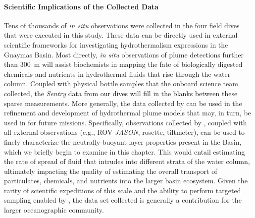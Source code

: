 \paragraph{Scientific Implications of the Collected Data}
Tens of thousands of \emph{in situ} observations were collected in the four field dives that were executed in this study. These data can be directly used in external scientific frameworks for investigating hydrothermalism expressions in the Guaymas Basin. Most directly, \emph{in situ} observations of plume detections further than \SI{300}{\meter} will assist biochemists in mapping the fate of biologically digested chemicals and nutrients in hydrothermal fluids that rise through the water column. Coupled with physical bottle samples that the onboard science team collected, the \emph{Sentry} data from our dives will fill in the blanks between these sparse measurements. More generally, the data collected by \Sentry can be used in the refinement and development of hydrothermal plume models that may, in turn, be used in \PHUMES for future missions. Specifically, observations collected by \Sentry, coupled with all external observations (e.g., ROV \emph{JASON}, rosette, tiltmeter), can be used to finely characterize the neutrally-buoyant layer properties present in the Basin, which we briefly begin to examine in this chapter. This would entail estimating the rate of spread of fluid that intrudes into different strata of the water column, ultimately impacting the quality of estimating the overall transport of particulates, chemicals, and nutrients into the larger basin ecosystem. Given the rarity of scientific expeditions of this scale and the ability to perform targeted sampling enabled by \PHORTEX, the data set collected is generally a contribution for the larger oceanographic community.   

